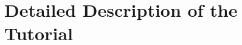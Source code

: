 \documentclass[a4paper,11pt]{article}
\begin{document}
%
%
%
%
%
%
\section{Detailed Description of the Tutorial}

\end{document}
